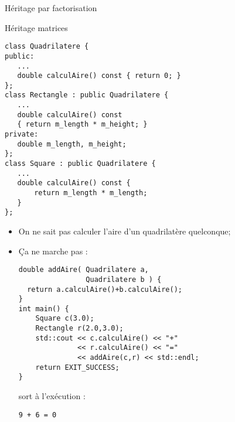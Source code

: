 \documentclass[handout,10pt]{beamer}
\begin{document}
\begin{frame}[fragile]{Héritage par factorisation}
\tiny
\begin{exampleblock}{Héritage matrices}
\begin{minipage}{0.48\textwidth}
\begin{lstlisting}
class Quadrilatere {
public:
   ...
   double calculAire() const { return 0; }
};
class Rectangle : public Quadrilatere {
   ...
   double calculAire() const
   { return m_length * m_height; }
private:
   double m_length, m_height;
};
class Square : public Quadrilatere {
   ...
   double calculAire() const {
       return m_length * m_length;
   }
};\end{lstlisting}
\end{minipage}\hfill
\begin{minipage}{0.48\textwidth}
\begin{itemize}
\item On ne sait pas calculer l'aire d'un quadrilatère quelconque;
\item Ça ne marche pas :
\begin{lstlisting}
double addAire( Quadrilatere a, 
                Quadrilatere b ) {
  return a.calculAire()+b.calculAire();
}
int main() {
    Square c(3.0);
    Rectangle r(2.0,3.0);
    std::cout << c.calculAire() << "+" 
              << r.calculAire() << "="
              << addAire(c,r) << std::endl;
    return EXIT_SUCCESS;
}
\end{lstlisting}
sort à l'exécution :
\begin{lstlisting}
9 + 6 = 0
\end{lstlisting}
\end{itemize}
\end{minipage}
\end{exampleblock}

\end{frame}
\end{document}
